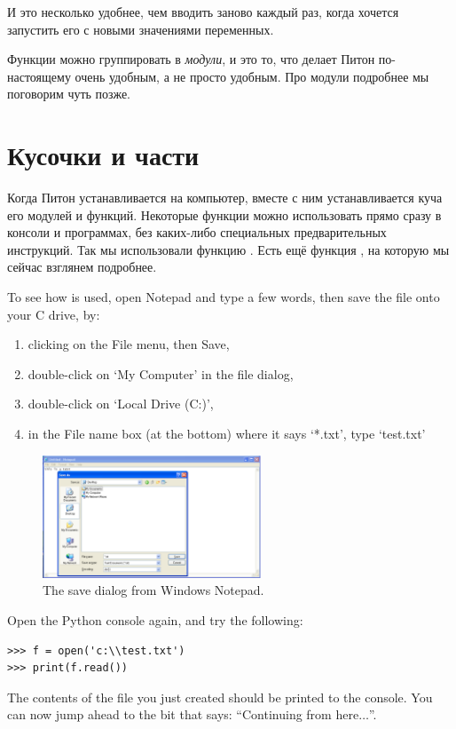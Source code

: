 И это несколько удобнее, чем вводить заново  каждый раз, когда хочется запустить его с новыми значениями переменных.

Функции можно группировать в \emph{модули}, и это то, что делает Питон по-настоящему очень удобным, а не просто удобным. Про модули подробнее мы поговорим чуть позже.

\section{Кусочки и части}

Когда Питон устанавливается на компьютер, вместе с ним устанавливается куча его модулей и функций. Некоторые функции можно использовать прямо сразу в консоли и программах, без каких-либо специальных предварительных инструкций. Так мы использовали функцию . Есть ещё функция , на которую мы сейчас взглянем подробнее.

\begin{WINDOWS}

To see how  is used, open Notepad and type a few words, then save the file onto your C drive, by:

\begin{enumerate}
 \item clicking on the File menu, then Save,
 \item double-click on `My Computer' in the file dialog,
 \item double-click on `Local Drive (C:)',
 \item in the File name box (at the bottom) where it says `*.txt', type `test.txt' 
\end{enumerate}

\begin{figure}
\begin{center}
\includegraphics[width=65mm]{../en/figure17.eps}
\end{center}
\caption{The save dialog from Windows Notepad.}\label{fig17}
\end{figure}

Open the Python console again, and try the following:

\begin{listing}
\begin{verbatim}
>>> f = open('c:\\test.txt')
>>> print(f.read())
\end{verbatim}
\end{listing}

The contents of the file you just created should be printed to the console. You can now jump ahead to the bit that says: ``Continuing from here$\ldots$''.
\end{WINDOWS}


